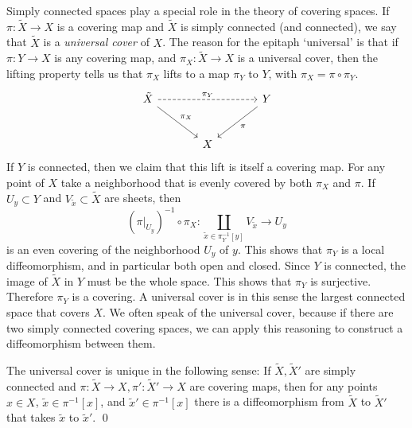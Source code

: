Simply connected spaces play a special role in the theory of covering spaces.
If $\pi : \tilde{X} \to X$ is a covering map and $\tilde{X}$ is simply connected (and connected), we say that $\tilde{X}$ is a \emph{universal cover} of $X$.
The reason for the epitaph `universal' is that if $\pi : Y \to X$ is any covering map, and $\pi_X : \tilde{X} \to X$ is a universal cover, then the lifting property tells us that $\pi_X$ lifts to a map $\pi_Y$ to $Y$, with $\pi_X = \pi \circ \pi_Y$.
\[\begin{tikzcd}[sep=large]
\tilde{X} \arrow{rd}{\pi_X} \arrow[dashed]{rr}{\pi_Y} && Y \arrow{ld}{\pi} \\
& X &
\end{tikzcd}\]
If $Y$ is connected, then we claim that this lift is itself a covering map.
For any point of $X$ take a neighborhood that is evenly covered by both $\pi_X$ and $\pi$.
If $U_y \subset Y$ and $V_{\tilde{x}} \subset \tilde{X}$ are sheets, then
\[
(\pi|_{U_y})^{-1} \circ \pi_X : \coprod_{\tilde{x} \in \pi_Y^{-1}[y]} V_{\tilde{x}} \to U_y
\]
is an even covering of the neighborhood $U_y$ of $y$.
This shows that $\pi_Y$ is a local diffeomorphism, and in particular both open and closed.
Since $Y$ is connected, the image of $\tilde{X}$ in $Y$ must be the whole space.
This shows that $\pi_Y$ is surjective.
Therefore $\pi_Y$ is a covering.
A universal cover is in this sense the largest connected space that covers $X$.
We often speak of the universal cover, because if there are two simply connected covering spaces, we can apply this reasoning to construct a diffeomorphism between them.

\begin{corollary}
The universal cover is unique in the following sense:
If $\tilde{X},\tilde{X}'$ are simply connected and $\pi : \tilde{X} \to X, \pi': \tilde{X}'\to X$ are covering maps, then for any points $x \in X$, $\tilde{x} \in \pi^{-1}[x]$, and $\tilde{x}' \in \pi^{-1}[x]$ there is a diffeomorphism from $\tilde{X}$ to $\tilde{X}'$ that takes $\tilde{x}$ to $\tilde{x}'$.
\qed
\end{corollary}




